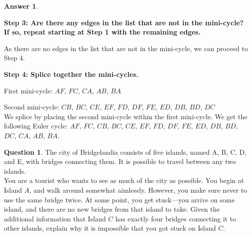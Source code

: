 \documentclass[article, 12pt]{article}
\theoremstyle{definition}
\newtheorem{question}{Question}
\newtheorem{answer}{Answer}
\begin{document}
\begin{answer}
\begin{figure}[H]
        \end{figure}
        \textbf{Step 3: Are there any edges in the list that are not in the mini-cycle? If so, repeat starting at Step 1 with the remaining edges.}
        
        As there are no edges in the list that are not in the mini-cycle, we can proceed to Step 4.
        
        \textbf{Step 4: Splice together the mini-cycles.}

        {\color{red} First mini-cycle: $AF$, $FC$, $CA$, $AB$, $BA$}

        {\color{blue} Second mini-cycle: $CB$, $BC$, $CE$, $EF$, $FD$, $DF$, $FE$, $ED$, $DB$, $BD$, $DC$}
        \\[12pt]
        We splice by placing the second mini-cycle within the first mini-cycle. We get the following Euler cycle: {\color{red} $AF$, $FC$,} {\color{blue}$CB$, $BC$, $CE$, $EF$, $FD$, $DF$, $FE$, $ED$, $DB$, $BD$, $DC$,} {\color{red}$CA$, $AB$, $BA$}.

    \end{answer}
    \begin{question}
        The city of Bridgelandia consists of five islands, named A, B, C, D, and E, with bridges connecting them. It is possible to travel between any two islands.
        \\[12pt]
        You are a tourist who wants to see as much of the city as possible. You begin at Island $A$, and walk around somewhat aimlessly. However, you make sure never to use the same bridge twice. At some point, you get stuck---you arrive on some island, and there are no new bridges from that island to take. Given the additional information that Island $C$ has exactly four bridges connecting it to other islands, explain why it is impossible that you got stuck on Island $C$.
    \end{question}
\end{document}

